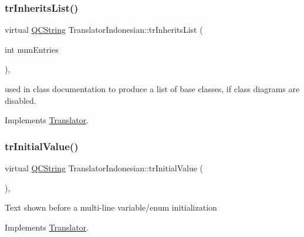 \mbox{\label{class_translator_indonesian_a486456f2f8f9b459150a6d6e21b8b80a}} 
\subsubsection{\texorpdfstring{trInheritsList()}{trInheritsList()}}
{\footnotesize\ttfamily virtual \mbox{\hyperlink{class_q_c_string}{Q\+C\+String}} Translator\+Indonesian\+::tr\+Inherits\+List (\begin{DoxyParamCaption}\item[{int}]{num\+Entries }\end{DoxyParamCaption})\hspace{0.3cm}{\ttfamily [inline]}, {\ttfamily [virtual]}}

used in class documentation to produce a list of base classes, if class diagrams are disabled. 

Implements \mbox{\hyperlink{class_translator}{Translator}}.

\mbox{\label{class_translator_indonesian_ab9a3bcb62c77b92bd7b6e348f2f39547}} 
\subsubsection{\texorpdfstring{trInitialValue()}{trInitialValue()}}
{\footnotesize\ttfamily virtual \mbox{\hyperlink{class_q_c_string}{Q\+C\+String}} Translator\+Indonesian\+::tr\+Initial\+Value (\begin{DoxyParamCaption}{ }\end{DoxyParamCaption})\hspace{0.3cm}{\ttfamily [inline]}, {\ttfamily [virtual]}}

Text shown before a multi-\/line variable/enum initialization 

Implements \mbox{\hyperlink{class_translator}{Translator}}.

\mbox{\label{class_translator_indonesian_a074fda272841327a4aefed94bf958660}} 
